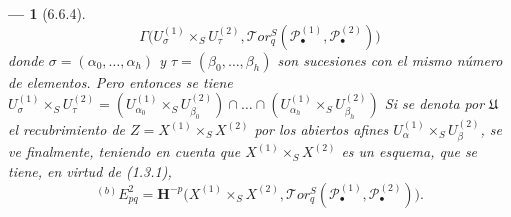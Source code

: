 \documentclass[10pt,oneside,openany]{book}
\theoremstyle{egaenv}\newtheorem*{env}{---}
\theoremstyle{egastatement}
\theoremstyle{egadescription}
\begin{document}
\begin{env}[6.6.4]
\[  \Gamma\bigl(U_\sigma^{(1)}\times_S U_\tau^{(2)},
    \mathscr{T}\!or_q^S
    (\mathscr P_\bullet^{(1)},\mathscr P_\bullet^{(2)})\bigr)
\]
donde $\sigma=(\alpha_0,\ldots,\alpha_h)$ y
$\tau=(\beta_0,\ldots,\beta_h)$ son sucesiones con el \emph{mismo número de
elementos}. Pero entonces se tiene
$U_\sigma^{(1)}\times_S U_\tau^{(2)}
=(U_{\alpha_0}^{(1)}\times_S U_{\beta_0}^{(2)})\cap\ldots\cap
(U_{\alpha_h}^{(1)}\times_S U_{\beta_h}^{(2)})$
Si se denota por $\mathfrak U$ el recubrimiento de
$Z=X^{(1)}\times_S X^{(2)}$ por los abiertos afines
$U_\alpha^{(1)}\times_S U_\beta^{(2)}$, se ve finalmente, teniendo en cuenta
que $X^{(1)}\times_S X^{(2)}$ es un \emph{esquema}, que se tiene, en virtud de
(1.3.1),
\[
  {}^{(b)}E_{pq}^2
  =\mathbf H^{-p}\bigl(X^{(1)}\times_S X^{(2)},
    \mathscr{T}\!or_q^S
    (\mathscr P_\bullet^{(1)},\mathscr P_\bullet^{(2)})\bigr).
\]


\end{env}
\end{document}
